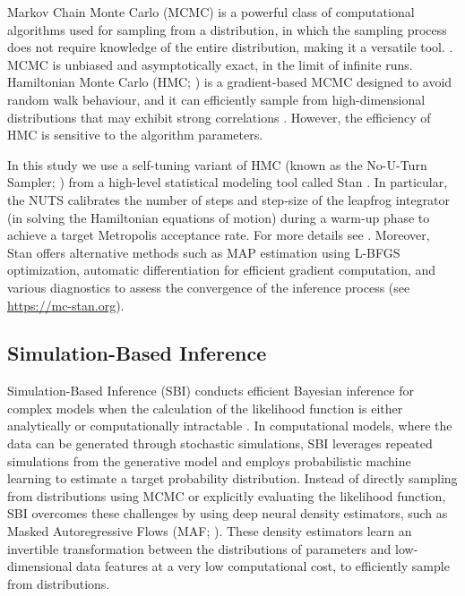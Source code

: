 \documentclass[12pt]{article}
\begin{document}
Markov Chain Monte Carlo (MCMC) is a powerful class of computational algorithms used for sampling from a distribution, in which the sampling process does not require knowledge of the entire distribution, making it a versatile tool. \citep{Andrieu2003, Murphy2022, Mcelreath2020}. MCMC is unbiased and asymptotically exact, in the limit of infinite runs. Hamiltonian Monte Carlo (HMC; \cite{Duane1987, Neal2010}) is a gradient-based MCMC designed to avoid random walk behaviour, and it can efficiently sample from high-dimensional distributions that may exhibit strong correlations \citep{Betancourt2017}. However, the efficiency of HMC is sensitive to the algorithm parameters. 

In this study we use a self-tuning variant of HMC (known as the No-U-Turn Sampler; \cite{Hoffman2014}) from a high-level statistical modeling tool called Stan \citep{Carpenter2017}.
In particular, the NUTS calibrates the number of steps and step-size of the leapfrog integrator (in solving the Hamiltonian equations of motion) during a warm-up phase to achieve a target Metropolis acceptance rate. For more details see \cite{Betancourt2013, Baldy2023}. Moreover, Stan offers alternative methods such as MAP estimation using L-BFGS optimization, automatic differentiation for efficient gradient computation, and various diagnostics to assess the convergence of the inference process (see \url{https://mc-stan.org}). 



\subsection{Simulation-Based Inference}

Simulation-Based Inference (SBI) conducts efficient Bayesian inference for complex models when the calculation of the likelihood function is either analytically or computationally intractable \citep{Cranmer2020, Brehmer2021}.
In computational models, where the data can be generated through stochastic simulations, SBI leverages repeated simulations from the generative model and employs probabilistic machine learning to estimate a target probability distribution. Instead of directly sampling from distributions using MCMC or explicitly evaluating the likelihood function, SBI overcomes these challenges by using deep neural density estimators, such as Masked Autoregressive Flows (MAF; \cite{Papamakarios2017}).  These density estimators learn an invertible transformation between the distributions of parameters and low-dimensional data features at a very low computational cost, to efficiently sample from distributions. 
\end{document}
